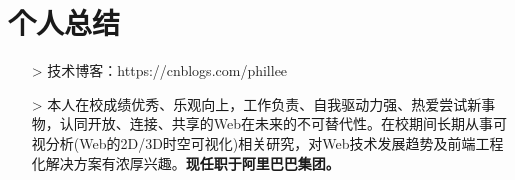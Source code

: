 \documentclass{resume}
\begin{document}

\section{个人总结}
\begin{itemize}
  \item [>] 技术博客：https://cnblogs.com/phillee
  \item [>] 本人在校成绩优秀、乐观向上，工作负责、自我驱动力强、热爱尝试新事物，认同开放、连接、共享的Web在未来的不可替代性。在校期间长期从事可视分析(Web的2D/3D时空可视化)相关研究，对Web技术发展趋势及前端工程化解决方案有浓厚兴趣。\textbf{现任职于阿里巴巴集团。}
\end{itemize}

%
%
\end{document}
